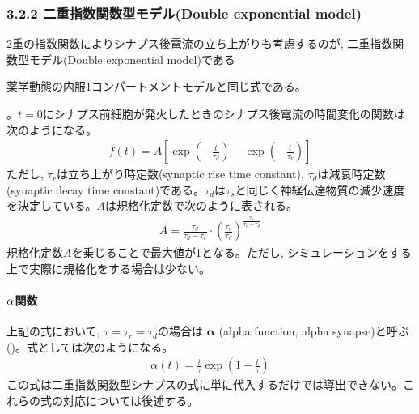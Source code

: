 \documentclass[letterpaper,10pt,english]{sphinxmanual}
\begin{document}
\subsubsection{3.2.2 二重指数関数型モデル(Double exponential model)}
\label{\detokenize{3-3_expo-synapse:double-exponential-model}}
2重の指数関数によりシナプス後電流の立ち上がりも考慮するのが, 二重指数関数型モデル(Double exponential model)である%
\begin{footnote}[3]\sphinxAtStartFootnote
薬学動態の内服1コンパートメントモデルと同じ式である。
%
\end{footnote}。\(t=0\)にシナプス前細胞が発火したときのシナプス後電流の時間変化の関数は次のようになる。
\begin{equation*}
\begin{split}
\begin{equation}
f(t)=A\left[\exp\left(-\frac{t}{\tau_d}\right)-\exp\left(-\frac{t}{\tau_r}\right)\right]    
\end{equation}
\end{split}
\end{equation*}
ただし, \({\tau_r}\)は立ち上がり時定数(synaptic rise time constant), \({\tau_d}\)は減衰時定数(synaptic decay time constant)である。\(\tau_{d}\)は\(\tau_{s}\)と同じく神経伝達物質の減少速度を決定している。\(A\)は規格化定数で次のように表される。
\begin{equation*}
\begin{split}
\begin{equation}
A=\frac{\tau_d}{\tau_d-\tau_r}\cdot \left(\frac{\tau_r}{\tau_d}\right)^\frac{\tau_r}{\tau_r-\tau_d}    
\end{equation}
\end{split}
\end{equation*}
規格化定数\(A\)を乗じることで最大値が1となる。ただし, シミュレーションをする上で実際に規格化をする場合は少ない。


\paragraph{\protect\(\alpha\protect\)関数}
\label{\detokenize{3-3_expo-synapse:alpha}}
上記の式において, \(\tau=\tau_{r}=\tau_{d}\)の場合は \(\boldsymbol{\alpha}\)  (alpha function, alpha synapse)と呼ぶ ()。式としては次のようになる。
\begin{equation*}
\begin{split}
\begin{equation}
\alpha(t)=\frac{t}{\tau}\exp\left(1-\frac{t}{\tau}\right)    
\end{equation}
\end{split}
\end{equation*}
この式は二重指数関数型シナプスの式に単に代入するだけでは導出できない。これらの式の対応については後述する。
\end{document}
